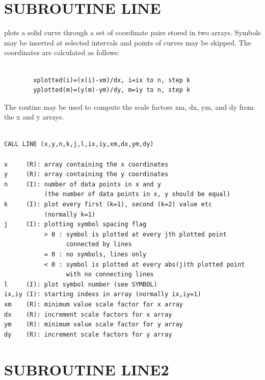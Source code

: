 \documentclass[11pt]{report}
\begin{document}
\section{SUBROUTINE LINE}

 plots a solid curve through a set of coordinate pairs
stored in two arrays. Symbols may be inserted at selected
intervals and points of curves may be skipped.
The coordinates are calculated as follows:
\begin{verbatim}

        xplotted(i)=(x(i)-xm)/dx, i=ix to n, step k
        yplotted(m)=(y(m)-ym)/dy, m=iy to n, step k

\end{verbatim}
The routine  may be used to compute the scale factors xm, dx,
ym, and dy from the x and y arrays.
\begin{verbatim}

CALL LINE (x,y,n,k,j,l,ix,iy,xm,dx,ym,dy)

x     (R): array containing the x coordinates
y     (R): array containing the y coordinates
n     (I): number of data points in x and y
           (the number of data points in x, y should be equal)
k     (I): plot every first (k=1), second (k=2) value etc
           (normally k=1)
j     (I): plotting symbol spacing flag
           > 0 : symbol is plotted at every jth plotted point
                 connected by lines
           = 0 : no symbols, lines only
           < 0 : symbol is plotted at every abs(j)th plotted point
                 with no connecting lines
l     (I): plot symbol number (see SYMBOL)
ix,iy (I): starting indexs in array (normally ix,iy=1)
xm    (R): minimum value scale factor for x array
dx    (R): increment scale factors for x array
ym    (R): minimum value scale factor for y array
dy    (R): increment scale factors for y array
\end{verbatim}

\section{SUBROUTINE LINE2}
\end{document}
